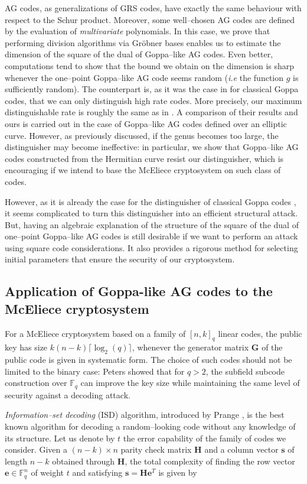 \documentclass[peerreview]{IEEEtran}
\theoremstyle{plain}
\theoremstyle{definition}
\theoremstyle{remark}
\newcommand{\fq}{\mathbb{F}_{q}}
\begin{document}
	
	AG codes, as generalizations of GRS codes, have exactly the same behaviour with respect to the Schur product. Moreover, some well--chosen AG codes are defined by the evaluation of \textit{multivariate} polynomials. In this case, we prove that performing division algorithms via Gr\"obner bases enables us to estimate the dimension of the square of the dual of Goppa--like AG codes. Even better, computations tend to show that the bound we obtain on the dimension is sharp whenever the one--point Goppa--like AG code seems random (\emph{i.e} the function $g$ is sufficiently random). The counterpart is, as it was the case in \cite{MT21} for classical Goppa codes, that we can only distinguish high rate codes. More precisely, our maximum distinguishable rate is roughly the same as in \cite{MT21}. A comparison of their results and ours is carried out in the case of Goppa--like AG codes defined over an elliptic curve. However, as previously discussed, if the genus becomes too large, the distinguisher may become ineffective: in particular, we show that Goppa--like AG codes constructed from the Hermitian curve resist our distinguisher, which is encouraging if we intend to base the McEliece cryptosystem on such class of codes.
	
	However, as it is already the case for the distinguisher of classical Goppa codes \cite{MT21}, it seems complicated to turn this distinguisher into an efficient structural attack. But, having an algebraic explanation of the structure of the square of the dual of one--point Goppa--like AG codes is still desirable if we want to perform an attack using square code considerations. It also provides a rigorous method for selecting initial parameters that ensure the security of our cryptosystem.
	
	\subsection*{Application of Goppa-like AG codes to the McEliece cryptosystem}
	\noindent
	For a McEliece cryptosystem based on a family of $[n,k]_q$ linear codes, the public key has size $k(n-k)\lceil \log_2(q) \rceil$, whenever the generator matrix $\mathbf{G}$ of the public code is given in systematic form. The choice of such codes should not be limited to the binary case: Peters \cite{petersIsd} showed that for $q > 2$, the subfield subcode construction over $\fq$ can improve the key size while maintaining the same level of security against a decoding attack. 
	
	\emph{Information--set decoding} (ISD) algorithm, introduced by Prange \cite{prange}, is the best known algorithm for decoding a random--looking code without any knowledge of its structure. Let us denote by $t$ the error capability of the family of codes we consider.  Given a $(n-k) \times n$ parity check matrix $\mathbf{H}$ and a column vector $\mathbf{s}$ of length $n-k$ obtained through $\mathbf{H}$, the total complexity of finding the row vector $\mathbf{e} \in \fq^n$ of weight $t$ and satisfying $\mathbf{s}=\mathbf{H}\mathbf{e}^{T}$ is given by 
	
\end{document}
